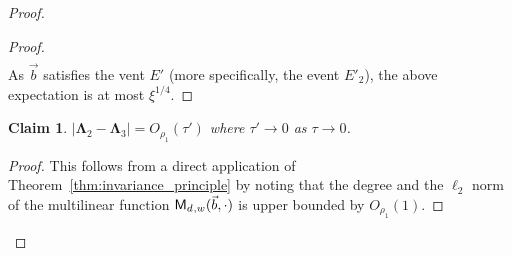 \documentclass[10pt,a4paper]{amsart}
\newtheorem{claim}[thm]{Claim}
\newcommand\card[1]{\left| {#1} \right|}
\newcommand{\V}[1]{{#1}}
\begin{document}
\begin{proof}
\begin{proof}
\begin{align*}
    \end{align*}
    As $\vec{b}$ satisfies the vent $E'$ (more specifically, the event $E'_2$), the above expectation is at most $\xi^{1/4}$.
   \end{proof}
   \begin{claim}\label{claim:inv_gaussian} $\card {\mathbf{\Lambda}_2 - \mathbf{\Lambda}_3} = O_{\rho_1}(\tau')$ where $\tau'\rightarrow 0 $ as $\tau \rightarrow 0$. 
   \end{claim}
   \begin{proof}
       This follows from a direct application of Theorem~\ref{thm:invariance_principle} by noting that the degree and the $\ell_2$ norm of the multilinear function $\multilinfcoarsedecoupled_{,\V w}(\vec{b}, \cdot)$ is upper bounded by $O_{\rho_1}(1)$.
   \end{proof}


  
   

\end{proof}
\end{document}
